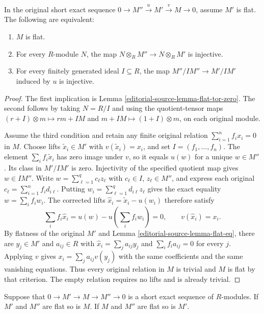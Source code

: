 \begin{lemma}
\label{editorial-source-lemma-flat-quotient-cyclic-tensor-criterion}
In the original short exact sequence
$0\to M''\xrightarrow{u}M'\xrightarrow{v}M\to0$,
assume $M'$ is flat. The following are equivalent:
\begin{enumerate}
\item $M$ is flat.
\item For every $R$-module $N$, the map
$N\otimes_R M''\to N\otimes_R M'$ is injective.
\item For every finitely generated ideal $I\subseteq R$,
the map $M''/IM''\to M'/IM'$ induced by $u$ is injective.
\end{enumerate}
\end{lemma}

\begin{proof}
The first implication is Lemma \ref{editorial-source-lemma-flat-tor-zero}.
The second follows by taking $N=R/I$ and using the
quotient-tensor maps $(r+I)\otimes m\mapsto rm+IM$
and $m+IM\mapsto(1+I)\otimes m$, on each original module.

Assume the third condition and retain any finite original
relation $\sum_{i=1}^n f_ix_i=0$ in $M$.
Choose lifts $\widetilde x_i\in M'$ with
$v(\widetilde x_i)=x_i$, and set $I=(f_1,\ldots,f_n)$.
The element $\sum_i f_i\widetilde x_i$ has zero image
under $v$, so it equals $u(w)$ for a unique $w\in M''$.
Its class in $M'/IM'$ is zero. Injectivity of the specified
quotient map gives $w\in IM''$.
Write $w=\sum_{\ell=1}^q c_\ell z_\ell$ with
$c_\ell\in I$, $z_\ell\in M''$, and express each original
$c_\ell=\sum_{i=1}^n f_i d_{i\ell}$.
Putting $w_i=\sum_{\ell=1}^q d_{i\ell}z_\ell$ gives the
exact equality $w=\sum_i f_iw_i$.
The corrected lifts
$\widehat x_i=\widetilde x_i-u(w_i)$ therefore satisfy
$$
\sum_i f_i\widehat x_i
=u(w)-u\left(\sum_i f_iw_i\right)=0,
\qquad v(\widehat x_i)=x_i.
$$
By flatness of the original $M'$ and
Lemma \ref{editorial-source-lemma-flat-eq}, there are $y_j\in M'$ and
$a_{ij}\in R$ with
$\widehat x_i=\sum_j a_{ij}y_j$ and
$\sum_i f_i a_{ij}=0$ for every $j$.
Applying $v$ gives $x_i=\sum_j a_{ij}v(y_j)$ with the
same coefficients and the same vanishing equations.
Thus every original relation in $M$ is trivial and
$M$ is flat by that criterion. The empty relation
requires no lifts and is already trivial.
\end{proof}


\begin{lemma}
\label{editorial-source-lemma-flat-ses}
Suppose that $0 \to M' \to M \to M'' \to 0$ is
a short exact sequence of $R$-modules.
If $M'$ and $M''$ are flat so is $M$.
If $M$ and $M''$ are flat so is $M'$.
\end{lemma}

